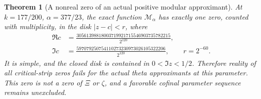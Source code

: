 \documentclass[11pt]{article}
\newtheorem{theorem}{Theorem}
\theoremstyle{remark}\newtheorem{remark}[theorem]{Remark}
\begin{document}
\begin{theorem}[A nonreal zero of an actual positive modular approximant]
\label{thm:mehler-strip-obstruction}
At $k=177/200$, $\alpha=377/23$, the exact function
$\mathcal M_\alpha$ has exactly one zero, counted with multiplicity,
in the disk $|z-c|<r$, where
\[
 \begin{aligned}
 \Re c&=\frac{30561398818003719921715546903735782215}{2^{120}},\\
 \Im c&=\frac{597079250754110273230973026105322206}{2^{120}},
 \qquad r=2^{-60}.
 \end{aligned} \tag{MCert}
\]
It is simple, and the closed disk is contained in $0<\Im z<1/2$.
Therefore reality of all critical-strip zeros fails for the actual
theta approximants at this parameter. This zero is not a zero of
$\Xi$ or $\zeta$, and a favorable cofinal parameter sequence remains
unexcluded.
\end{theorem}
\end{document}
